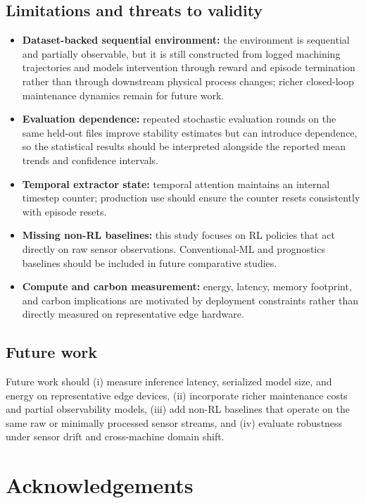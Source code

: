 \documentclass[sn-basic]{sn-jnl} %
\begin{document}
\subsection{Limitations and threats to validity}
\begin{itemize}
        \item \textbf{Dataset-backed sequential environment:} the environment is sequential and partially observable, but it is still constructed from logged machining trajectories and models intervention through reward and episode termination rather than through downstream physical process changes; richer closed-loop maintenance dynamics remain for future work.
        \item \textbf{Evaluation dependence:} repeated stochastic evaluation rounds on the same held-out files improve stability estimates but can introduce dependence, so the statistical results should be interpreted alongside the reported mean trends and confidence intervals.
        \item \textbf{Temporal extractor state:} temporal attention maintains an internal timestep counter; production use should ensure the counter resets consistently with episode resets.
        \item \textbf{Missing non-RL baselines:} this study focuses on RL policies that act directly on raw sensor observations. Conventional-ML and prognostics baselines should be included in future comparative studies.
        \item \textbf{Compute and carbon measurement:} energy, latency, memory footprint, and carbon implications are motivated by deployment constraints rather than directly measured on representative edge hardware.
\end{itemize}

\subsection{Future work}
Future work should (i) measure inference latency, serialized model size, and energy on representative edge devices, (ii) incorporate richer maintenance costs and partial observability models, (iii) add non-RL baselines that operate on the same raw or minimally processed sensor streams, and (iv) evaluate robustness under sensor drift and cross-machine domain shift.



\section*{Acknowledgements}
\end{document}
